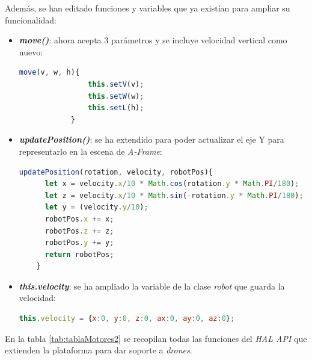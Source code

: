 Además, se han editado funciones y variables que ya existían para ampliar su funcionalidad: 
\begin{itemize}
    \item \textit{\textbf{move()}}: ahora acepta 3 parámetros y se incluye  velocidad vertical como nuevo:
        \begin{lstlisting}[language=javascript]
            move(v, w, h){
                this.setV(v);
                this.setW(w);
                this.setL(h);
            }
        \end{lstlisting}
    \item \textit{\textbf{updatePosition()}}: se ha extendido para poder actualizar el eje Y para representarlo en la escena de \textit{A-Frame}:
    \begin{lstlisting}[language=javascript]
    updatePosition(rotation, velocity, robotPos){
      let x = velocity.x/10 * Math.cos(rotation.y * Math.PI/180);
      let z = velocity.x/10 * Math.sin(-rotation.y * Math.PI/180);
      let y = (velocity.y/10);
      robotPos.x += x;
      robotPos.z += z;
      robotPos.y += y;
      return robotPos;
    }
\end{lstlisting}
    \item \textit{\textbf{this.velocity}}: se ha ampliado la variable de la clase \textit{robot} que guarda la velocidad:
    
\begin{lstlisting}[language=javascript]
        this.velocity = {x:0, y:0, z:0, ax:0, ay:0, az:0};
\end{lstlisting}
\end{itemize}


En la tabla \ref{tab:tablaMotores2} se recopilan todas las funciones del \textit{HAL API} que extienden la plataforma para dar soporte a \textit{drones}.

